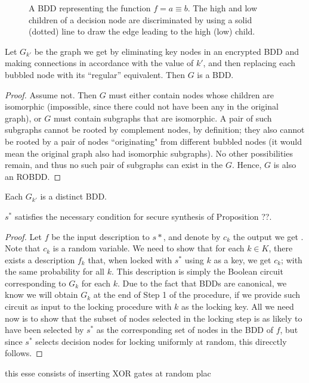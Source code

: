 \begin{figure}[h]
  \caption{A BDD representing the function $f = a \equiv b$. The high and low children of a decision node are discriminated by using a solid (dotted) line to draw the edge leading to the high (low) child.}
  \label{fig:dummy}
\end{figure}


\begin{lemma}
Let $G_{k'}$ be the graph we get by eliminating key nodes in an encrypted BDD and making connections in accordance with the value of $k'$, and then replacing each bubbled node with its ``regular'' equivalent. Then $G$ is a BDD.
\end{lemma}

\begin{proof}
Assume not. Then $G$ must either contain nodes whose children are isomorphic (impossible, since there could not have been any in the original graph), or $G$ must contain subgraphs that are isomorphic. A pair of such subgraphs cannot be rooted by complement nodes, by definition; they also cannot be rooted by a pair of nodes ``originating" from different bubbled nodes (it would mean the original graph also had isomorphic subgraphs). No other possibilities remain, and thus no such pair of subgraphs can exist in the $G$. Hence, $G$ is also an ROBDD.
\end{proof}

\begin{lemma}
Each $G_{k'}$ is a distinct BDD.
\end{lemma}

\begin{theorem}
$s^{*}$ satisfies the necessary condition for secure synthesis of Proposition ??.
\end{theorem}

\begin{proof}
Let $f$ be the input description to $s*$, and denote by $c_k$ the output we get . Note that $c_k$ is a random variable. We need to show that for each $k\in K$, there exists a description $f_k$ that, when locked with $s^{*}$ using $k$ as a key, we get $c_k$; with the same probability for all $k$. This description is simply the Boolean circuit corresponding to $G_{k}$ for each $k$. Due to the fact that BDDs are canonical, we know we will obtain $G_{k}$ at the end of Step 1 of the procedure, if we provide such circuit as input to the locking procedure with $k$ as the locking key. All we need now is to show that the subset of nodes selected in the locking step is as likely to have been selected by $s^{*}$ as the corresponding set of nodes in the BDD of $f$, but since $s^{*}$ selects decision nodes for locking uniformly at random, this direcctly follows.
\end{proof}

this esse consists of inserting XOR gates at random plac

